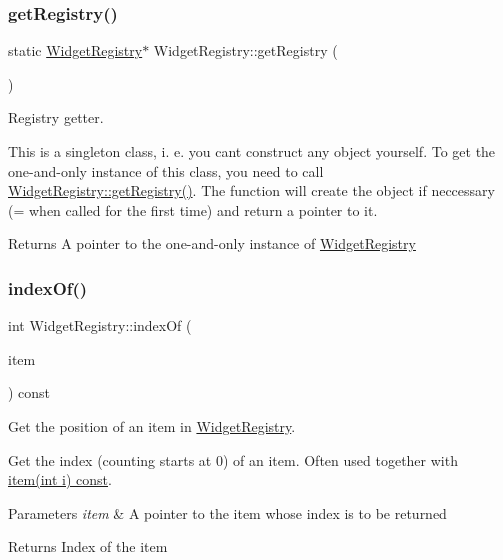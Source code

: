 \subsubsection{\texorpdfstring{get\+Registry()}{getRegistry()}}
{\footnotesize\ttfamily static \hyperlink{class_widget_registry}{Widget\+Registry}$\ast$ Widget\+Registry\+::get\+Registry (\begin{DoxyParamCaption}{ }\end{DoxyParamCaption})\hspace{0.3cm}{\ttfamily [static]}}



Registry getter. 

This is a singleton class, i. e. you can\textquotesingle{}t construct any object yourself. To get the one-\/and-\/only instance of this class, you need to call \hyperlink{class_widget_registry_ad0c8eaf65a4c00947866a56cc2c48eb2}{Widget\+Registry\+::get\+Registry()}. The function will create the object if neccessary (= when called for the first time) and return a pointer to it. \begin{DoxyReturn}{Returns}
A pointer to the one-\/and-\/only instance of \hyperlink{class_widget_registry}{Widget\+Registry} 
\end{DoxyReturn}
\hypertarget{class_widget_registry_aa0855242e9b8aa7ec76cace984c26e57}{}\label{class_widget_registry_aa0855242e9b8aa7ec76cace984c26e57} 
\subsubsection{\texorpdfstring{index\+Of()}{indexOf()}}
{\footnotesize\ttfamily int Widget\+Registry\+::index\+Of (\begin{DoxyParamCaption}\item[{\hyperlink{class_registry_item}{Registry\+Item} $\ast$}]{item }\end{DoxyParamCaption}) const}



Get the position of an item in \hyperlink{class_widget_registry}{Widget\+Registry}. 

Get the index (counting starts at 0) of an item. Often used together with \hyperlink{class_widget_registry_a432f0e1f366c3d5dce760e83fd8260fe}{item(int i) const}. 
\begin{DoxyParams}{Parameters}
{\em item} & A pointer to the item whose index is to be returned \\
\hline
\end{DoxyParams}
\begin{DoxyReturn}{Returns}
Index of the item 
\end{DoxyReturn}
\hypertarget{class_widget_registry_a3a323a51d1e65d61d6ed9b8639a21070}{}\label{class_widget_registry_a3a323a51d1e65d61d6ed9b8639a21070} 
